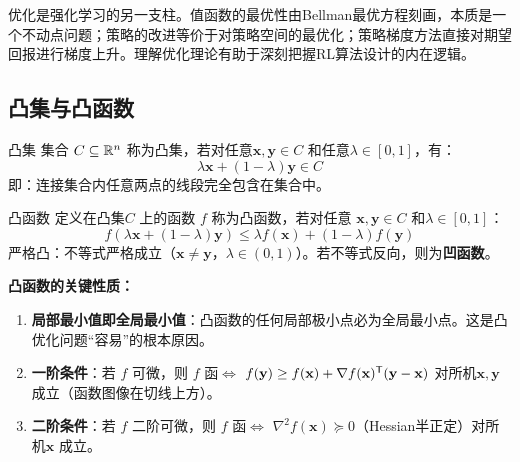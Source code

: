 优化是强化学习的另一支柱。值函数的最优性由Bellman最优方程刻画，本质是一个不动点问题；策略的改进等价于对策略空间的最优化；策略梯度方法直接对期望回报进行梯度上升。理解优化理论有助于深刻把握RL算法设计的内在逻辑。

\subsection{凸集与凸函数}

\begin{mydefinition}{凸集}
集合 $C \subseteq \mathbb{R}^n$ 称为凸集，若对任意$\mathbf{x}, \mathbf{y} \in C$ 和任意$\lambda \in [0, 1]$，有：
\[
\lambda \mathbf{x} + (1 - \lambda) \mathbf{y} \in C
\]
即：连接集合内任意两点的线段完全包含在集合中。
\end{mydefinition}

\begin{mydefinition}{凸函数}
定义在凸集$C$ 上的函数 $f$ 称为凸函数，若对任意 $\mathbf{x}, \mathbf{y} \in C$ 和$\lambda \in [0, 1]$：
\[
f(\lambda \mathbf{x} + (1 - \lambda) \mathbf{y}) \le \lambda f(\mathbf{x}) + (1 - \lambda) f(\mathbf{y})
\]
严格凸：不等式严格成立（$\mathbf{x} \neq \mathbf{y}$，$\lambda \in (0,1)$）。若不等式反向，则为\textbf{凹函数}。
\end{mydefinition}

\qquad
{}

\textbf{凸函数的关键性质：}
\begin{enumerate}
    \item \textbf{局部最小值即全局最小值}：凸函数的任何局部极小点必为全局最小点。这是凸优化问题``容易''的根本原因。
    \item \textbf{一阶条件}：若 $f$ 可微，则 $f$ 函$\iff$ $f(\mathbf{y}) \ge f(\mathbf{x}) + \nabla f(\mathbf{x})^{\mathsf{T}} (\mathbf{y} - \mathbf{x})$ 对所机$\mathbf{x}, \mathbf{y}$ 成立（函数图像在切线上方）。
    \item \textbf{二阶条件}：若 $f$ 二阶可微，则 $f$ 函$\iff$ $\nabla^2 f(\mathbf{x}) \succeq 0$（Hessian半正定）对所机$\mathbf{x}$ 成立。
\end{enumerate}

